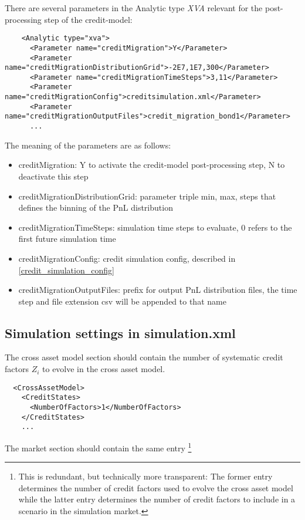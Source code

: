 \documentclass[12pt, a4paper]{article}
\begin{document}
There are several parameters in the Analytic type {\em XVA} relevant for the post-processing step of the credit-model:

\begin{verbatim}
    <Analytic type="xva">
      <Parameter name="creditMigration">Y</Parameter>
      <Parameter name="creditMigrationDistributionGrid">-2E7,1E7,300</Parameter>
      <Parameter name="creditMigrationTimeSteps">3,11</Parameter>
      <Parameter name="creditMigrationConfig">creditsimulation.xml</Parameter>
      <Parameter name="creditMigrationOutputFiles">credit_migration_bond1</Parameter>
      ...
\end{verbatim}

The meaning of the parameters are as follows:

\begin{itemize}
\item creditMigration: Y to activate the credit-model post-processing step, N to deactivate this step
\item creditMigrationDistributionGrid: parameter triple min, max, steps that defines the binning of the PnL distribution
\item creditMigrationTimeSteps: simulation time steps to evaluate, 0 refers to the first future simulation time
\item creditMigrationConfig: credit simulation config, described in \ref{credit_simulation_config}
\item creditMigrationOutputFiles: prefix for output PnL distribution files, the time step and file extension csv will be
  appended to that name
\end{itemize}

\subsection{Simulation settings in simulation.xml}

The cross asset model section should contain the number of systematic credit factors $Z_i$ to evolve in the cross asset
model.

\begin{verbatim}
  <CrossAssetModel>
    <CreditStates>
      <NumberOfFactors>1</NumberOfFactors>
    </CreditStates>
    ...
\end{verbatim}

The market section should contain the same entry \footnote{This is redundant, but technically more transparent: The former entry determines the number of credit factors used to evolve the cross asset model while the latter entry determines the number of credit factors to include in a scenario in the simulation market.}
\end{document}
